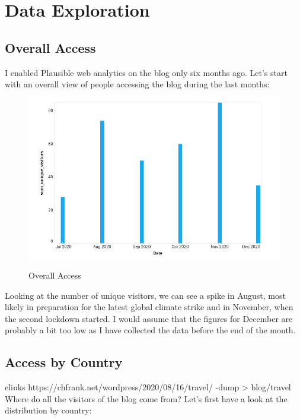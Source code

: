 %
%

\pagebreak
\section{Data Exploration}

\onehalfspacing

\subsection{Overall Access}

I enabled Plausible web analytics on the blog only six months ago. Let's start with an overall view of people accessing the blog during the last months:

\begin{figure}[H]
\centering
\caption {Overall Access}
\includegraphics[width=\linewidth]{images/access-overall.png}
\label{fig:accessOverall}
\end{figure}

Looking at the number of unique visitors, we can see a spike in August, most likely in preparation for the latest global climate strike and in November, when the second lockdown started. I would assume that the figures for December are probably a bit too low as I have collected the data before the end of the month.

\subsection{Access by Country}
elinks https://chfrank.net/wordpress/2020/08/16/travel/ -dump > blog/travel
Where do all the visitors of the blog come from? Let's first have a look at the distribution by country:

